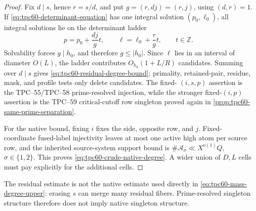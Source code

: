 \begin{proof}
Fix \(d\mid s\), hence \(r=s/d\), and put
\(g=(r,dj)=(r,j)\), using \((d,r)=1\).  If
\eqref{eq:tpc60-determinant-equation} has one integral solution
\((p_0,\ell_0)\), all integral solutions lie on the determinant ladder
\begin{equation}
 p=p_0+\frac{dj}{g}t,
 \qquad
 \ell=\ell_0+\frac rg t,
 \qquad t\in\mathbb Z.
 \label{eq:tpc60-determinant-ladder}
\end{equation}
Solvability forces \(g\mid h_0\), and therefore \(g\le|h_0|\).  Since
\(\ell\) lies in an interval of diameter \(O(L)\), the ladder contributes
\(O_{h_0}(1+L/R)\) candidates.  Summing over \(d\mid s\) gives
\eqref{eq:tpc60-residual-degree-bound}; primality, retained-pair, residue,
  mask, and profile tests only delete candidates.  The fixed-
  \((i,s,p)\) assertion is the TPC--55/TPC--58 prime-resolved injection,
  while the stronger fixed-\((i,p)\) assertion is the TPC--59
  critical-cutoff row singleton proved again in
  \cref{prop:tpc60-same-prime-separation}.

  For the native bound, fixing \(i\) fixes the side, opposite row, and
  \(j\).  Fixed-coordinate fused-label injectivity leaves at most one
  active high atom per source row, and the inherited source-system support
  bound is
  \(\#\mathcal A_\sigma\ll X^{o(1)}Q\), \(\sigma\in\{1,2\}\).
  This proves \eqref{eq:tpc60-crude-native-degree}.  A wider union of
  \(D,L\) cells must pay explicitly for the additional cells.
\end{proof}

The residual estimate is not the native estimate used directly in
\eqref{eq:tpc60-mass-degree-upper}: erasing \(s\) can merge many residual
fibers.  Prime-resolved singleton structure therefore does not imply
native singleton structure.
